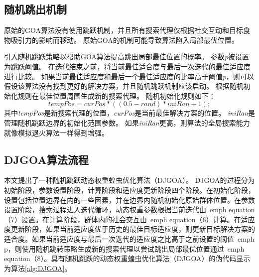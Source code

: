 \subsection{随机跳出机制}

原始的GOA算法没有使用跳跃机制，并且所有搜索代理仅根据社交互动和目标食物吸引力的影响而移动。 原始GOA的机制可能导致算法陷入局部最优位置。

引入随机跳跃策略以帮助GOA算法提高跳出局部最佳位置的概率。 参数\emph{p}被设置为跳跃阈值。 在迭代结束之前，将当前最佳适合度与最后一次迭代的最佳适应度进行比较。 如果当前最佳适应度和最后一个最佳适应度的比率高于阈值\emph{p}，则可以假设该算法没有找到更好的解决方案，并且随机跳跃机制应该启动。 根据随机初始化规则在最佳位置周围生成新的搜索代理。 随机初始化规则如下：
\begin{equation}
    tempPos=curPos*((0.5-rand)*iniRan+1);
\end{equation} 
其中\emph{tempPos}是新搜索代理的位置，\emph{curPos}是当前最佳解决方案的位置。 \emph{iniRan}是管理随机跳跃边界的初始化范围参数。 如果\emph{iniRan}更高，则算法的全局搜索能力就像模拟退火算法一样得到增强。
\subsection{DJGOA算法流程}

本文提出了一种随机跳跃动态权重蝗虫优化算法（DJGOA）。 DJGOA的过程分为初始阶段，参数设置阶段，计算阶段和适应度更新阶段四个阶段。在初始化阶段，设置包括位置边界在内的一些因素，并在边界内随机初始化原始群体位置。在参数设置阶段，搜索过程进入迭代循环，动态权重参数根据当前迭代由\ emph {equation（7）}设置。在计算阶段，群体内的社会交互由\ emph {equation（6）}计算。在适应度更新阶段，如果当前适应度优于历史的最佳目标适应度，则更新目标解决方案的适合度。如果当前适应度与最后一次迭代的适应度之比高于之前设置的阈值\ emph {p}，则使用随机跳转策略生成新的搜索代理以尝试跳出局部最优位置通过\ emph {equation（8）}。具有随机跳跃的动态权重蝗虫优化算法（DJGOA）的伪代码显示为算法\ref{alg:DJGOA}。

